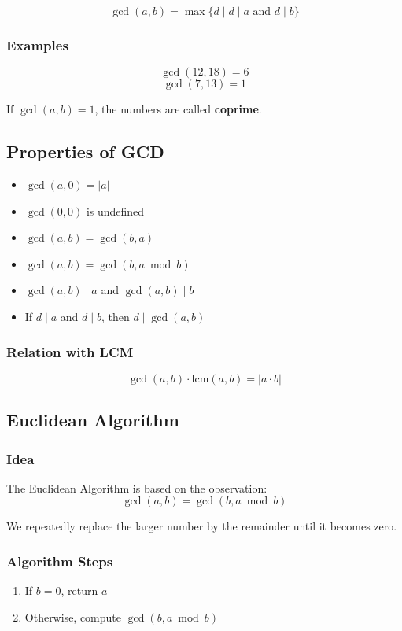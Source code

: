 \documentclass[11pt]{article}
\begin{document}
\[
\gcd(a, b) = \max \{ d \mid d \mid a \text{ and } d \mid b \}
\]

\subsubsection{Examples}
\[
\gcd(12, 18) = 6
\]
\[
\gcd(7, 13) = 1
\]

If $\gcd(a, b) = 1$, the numbers are called \textbf{coprime}.

\subsection{Properties of GCD}

\begin{itemize}
    \item $\gcd(a, 0) = |a|$
    \item $\gcd(0, 0)$ is undefined
    \item $\gcd(a, b) = \gcd(b, a)$
    \item $\gcd(a, b) = \gcd(b, a \bmod b)$
    \item $\gcd(a, b) \mid a$ and $\gcd(a, b) \mid b$
    \item If $d \mid a$ and $d \mid b$, then $d \mid \gcd(a, b)$
\end{itemize}

\subsubsection{Relation with LCM}
\[
\gcd(a, b) \cdot \text{lcm}(a, b) = |a \cdot b|
\]

\subsection{Euclidean Algorithm}

\subsubsection{Idea}
The Euclidean Algorithm is based on the observation:
\[
\gcd(a, b) = \gcd(b, a \bmod b)
\]

We repeatedly replace the larger number by the remainder until it becomes zero.

\subsubsection{Algorithm Steps}
\begin{enumerate}
    \item If $b = 0$, return $a$
    \item Otherwise, compute $\gcd(b, a \bmod b)$
\end{enumerate}
\end{document}
